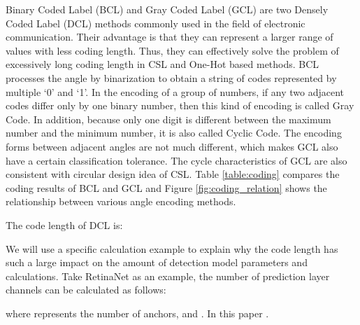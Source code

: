 \documentclass[10pt,journal,compsoc]{IEEEtran}
\begin{document}
Binary Coded Label (BCL) \cite{heath1972origins} and Gray Coded Label (GCL) \cite{frank1953pulse} are two Densely Coded Label (DCL) methods commonly used in the field of electronic communication. Their advantage is that they can represent a larger range of values with less coding length. Thus, they can effectively solve the problem of excessively long coding length in CSL and One-Hot based methods. BCL processes the angle by binarization to obtain a string of codes represented by multiple `0' and `1'. In the encoding of a group of numbers, if any two adjacent codes differ only by one binary number, then this kind of encoding is called Gray Code. In addition, because only one digit is different between the maximum number and the minimum number, it is also called Cyclic Code. The encoding forms between adjacent angles are not much different, which makes GCL also have a certain classification tolerance. The cycle characteristics of GCL are also consistent with circular design idea of CSL. Table \ref{table:coding} compares the coding results of BCL and GCL and Figure \ref{fig:coding_relation} shows the relationship between various angle encoding methods.

\begin{table}[tb!]
	\centering
	\caption{The three-digit binary code and gray code corresponding to the decimal number.}
	\label{table:coding}
\end{table}

The code length of DCL is:


We will use a specific calculation example to explain why the code length has such a large impact on the amount of detection model parameters and calculations. Take RetinaNet as an example, the number of prediction layer channels can be calculated as follows:

where  represents the number of anchors, and . In this paper .
\end{document}

